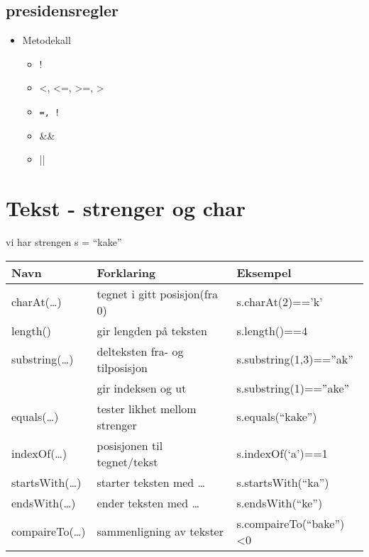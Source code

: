 \documentclass[11pt]{article}
\begin{document}
\subsection{presidensregler}
\label{sec-2_1}


\begin{itemize}
\item Metodekall

\begin{itemize}
\item !
\item <, <=, >=, >
\item \texttt{=, !}
\item \&\&
\item ||
\end{itemize}

\end{itemize}
\section{Tekst - strenger og char}
\label{sec-3}


  vi har strengen s = ``kake''
  

\begin{center}
\begin{tabular}{lll}
\hline
 Navn                  &  Forklaring                      &  Eksempel                  \\
\hline
 charAt(\ldots{})      &  tegnet i gitt posisjon(fra 0)   &  s.charAt(2)=='k'          \\
\hline
 length()              &  gir lengden på teksten          &  s.length()==4             \\
\hline
 substring(\ldots{})   &  delteksten fra- og tilposisjon  &  s.substring(1,3)==''ak''  \\
                       &  gir indeksen og ut              &  s.substring(1)==''ake''   \\
\hline
 equals(\ldots{})      &  tester likhet mellom strenger   &  s.equals(``kake'')        \\
\hline
 indexOf(\ldots{})     &  posisjonen til tegnet/tekst     &  s.indexOf(`a')==1         \\
\hline
 startsWith(\ldots{})  &  starter teksten med \ldots{}    &  s.startsWith(``ka'')      \\
\hline
 endsWith(\ldots{})    &  ender teksten med \ldots{}      &  s.endsWith(``ke'')        \\
\hline
 compaireTo(\ldots{})  &  sammenligning av tekster        &  s.compaireTo(``bake'')<0  \\
\hline
\end{tabular}
\end{center}
\end{document}
